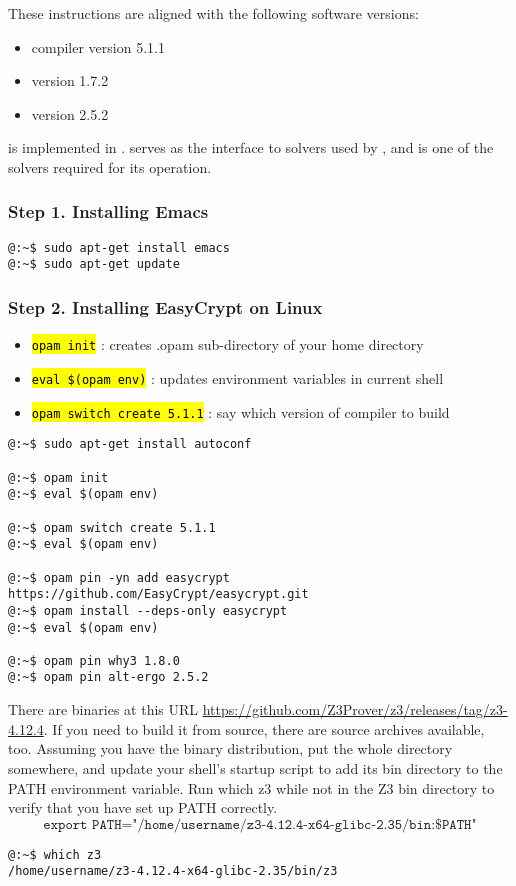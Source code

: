 These instructions are aligned with the following software versions:
\begin{itemize}
	\item \OCaml compiler version 5.1.1
	\item \WhyThree version 1.7.2
	\item \AltErgo version 2.5.2
\end{itemize}
\EasyCrypt is implemented in \OCaml. \WhyThree serves as the interface to \SMT solvers used by \EasyCrypt, and \AltErgo is one of the \SMT solvers required for its operation.

\subsubsection*{Step 1. Installing Emacs}
\begin{lstlisting}[style=normal]
@:~$ sudo apt-get install emacs
@:~$ sudo apt-get update
\end{lstlisting}

\subsubsection*{Step 2. Installing EasyCrypt on Linux}
\begin{itemize}
	\item \hl{\texttt{opam init}} : creates .opam sub-directory of your home directory
	\item \hl{\texttt{eval \$(opam env)}} : updates environment variables in current shell
	\item \hl{\texttt{opam switch create 5.1.1}} : say which version of \OCaml compiler to build
\end{itemize}
\begin{lstlisting}[style=normal]
@:~$ sudo apt-get install autoconf

@:~$ opam init
@:~$ eval $(opam env)

@:~$ opam switch create 5.1.1
@:~$ eval $(opam env)

@:~$ opam pin -yn add easycrypt https://github.com/EasyCrypt/easycrypt.git
@:~$ opam install --deps-only easycrypt
@:~$ eval $(opam env)

@:~$ opam pin why3 1.8.0
@:~$ opam pin alt-ergo 2.5.2
\end{lstlisting}

There are binaries at this URL \url{https://github.com/Z3Prover/z3/releases/tag/z3-4.12.4}. If you need to build it from source, there are source archives available, too. Assuming you have the binary distribution, put the whole directory somewhere, and update your shell's startup script to add its bin directory to the PATH environment variable. Run which z3 while not in the Z3 bin directory to verify that you have set up PATH correctly.
\[
\texttt{export PATH="/home/username/z3-4.12.4-x64-glibc-2.35/bin:\$PATH"}
\]
\begin{lstlisting}[style=normal]
@:~$ which z3
/home/username/z3-4.12.4-x64-glibc-2.35/bin/z3
\end{lstlisting}

